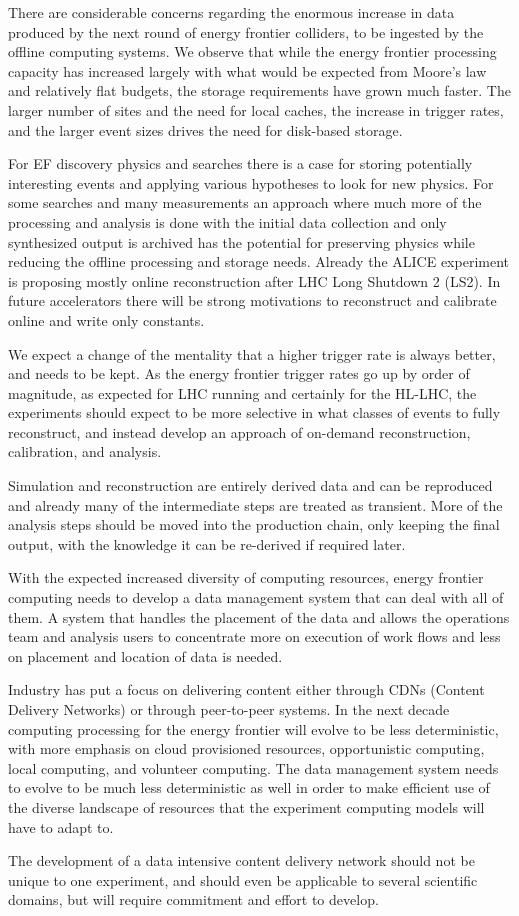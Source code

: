 There are considerable concerns regarding the enormous increase 
in data produced by the next round of energy frontier colliders,  
to be ingested by the offline computing systems. 
We observe that while
the energy frontier processing capacity has increased largely with what would be expected from
Moore's law and relatively flat budgets, the storage requirements have
grown much faster.  The larger number of sites and the need for local
caches, the increase in trigger rates, and the larger event sizes
drives the need for disk-based storage.  

For EF discovery physics and searches there is a case for storing
potentially interesting events and applying various hypotheses to look
for new physics.  For some searches and many measurements an approach
where much more of the processing and analysis is done with the
initial data collection and only synthesized output is archived has
the potential for preserving physics while reducing the offline
processing and storage needs.  Already the ALICE experiment is
proposing mostly online reconstruction after LHC Long Shutdown 2
(LS2).  In future accelerators there will be strong
motivations to reconstruct and calibrate online and write only
constants.

We expect a change of the mentality that a higher trigger rate is always better, and needs to be kept.  As the energy frontier trigger rates go up by order of magnitude, as expected for LHC running and certainly for the HL-LHC, the experiments should expect to be more
selective in what classes of events to fully reconstruct, and instead develop an approach of on-demand reconstruction, calibration, and
analysis.

Simulation and reconstruction are entirely
derived data and can be reproduced and already many of the
intermediate steps are treated as transient.  More of the analysis steps should be moved into the production
chain, only keeping the final output, with the knowledge it can be
re-derived if required later.

With the expected increased diversity of computing resources, energy frontier
computing needs to develop a data management system that can deal with
all of them.  A system that handles the placement of the data and
allows the operations team and analysis users to concentrate more on
execution of work flows and less on placement and location of data is
needed.  

Industry has put a focus on delivering
content either through CDNs (Content Delivery Networks) 
or through peer-to-peer systems.  In the
next decade computing processing for the energy frontier will evolve
to be less deterministic, with more emphasis on cloud provisioned
resources, opportunistic computing, local computing, and volunteer
computing.  The data management system needs to evolve to be much less
deterministic as well in order to make efficient use of the diverse
landscape of resources that the experiment computing models will have to adapt to. 

The development of a data intensive content delivery network
should not be unique to one experiment, and should even be applicable
to several scientific domains, but will require commitment and effort
to develop.


